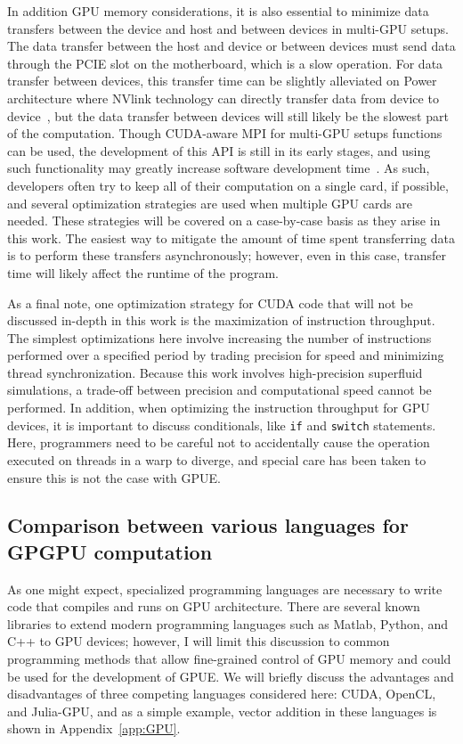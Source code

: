 In addition GPU memory considerations, it is also essential to minimize data transfers between the device and host and between devices in multi-GPU setups.
The data transfer between the host and device or between devices must send data through the PCIE slot on the motherboard, which is a slow operation.
For data transfer between devices, this transfer time can be slightly alleviated on Power architecture where NVlink technology can directly transfer data from device to device~\cite{foley2017}, but the data transfer between devices will still likely be the slowest part of the computation.
Though CUDA-aware MPI for multi-GPU setups functions can be used, the development of this API is still in its early stages, and using such functionality may greatly increase software development time~\cite{lonvcar2016, wang2013}.
As such, developers often try to keep all of their computation on a single card, if possible, and several optimization strategies are used when multiple GPU cards are needed.
These strategies will be covered on a case-by-case basis as they arise in this work.
The easiest way to mitigate the amount of time spent transferring data is to perform these transfers asynchronously; however, even in this case, transfer time will likely affect the runtime of the program.

As a final note, one optimization strategy for CUDA code that will not be discussed in-depth in this work is the maximization of instruction throughput.
The simplest optimizations here involve increasing the number of instructions performed over a specified period by trading precision for speed and minimizing thread synchronization.
Because this work involves high-precision superfluid simulations, a trade-off between precision and computational speed cannot be performed.
In addition, when optimizing the instruction throughput for GPU devices, it is important to discuss conditionals, like \texttt{if} and \texttt{switch} statements.
Here, programmers need to be careful not to accidentally cause the operation executed on threads in a warp to diverge, and special care has been taken to ensure this is not the case with GPUE.


\subsection{Comparison between various languages for GPGPU computation}
\label{sec:compare}

As one might expect, specialized programming languages are necessary to write code that compiles and runs on GPU architecture.
There are several known libraries to extend modern programming languages such as Matlab, Python, and C++ to GPU devices; however, I will limit this discussion to common programming methods that allow fine-grained control of GPU memory and could be used for the development of GPUE.
We will briefly discuss the advantages and disadvantages of three competing languages considered here: CUDA, OpenCL, and Julia-GPU, and as a simple example, vector addition in these languages is shown in  Appendix~\ref{app:GPU}.


